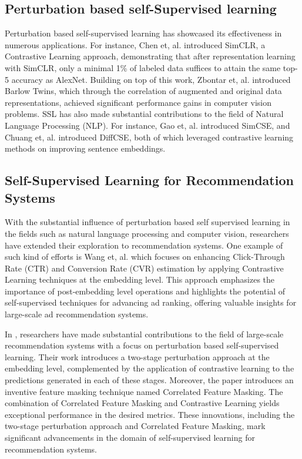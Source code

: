 \subsection{Perturbation based self-Supervised learning} Perturbation based self-supervised learning has showcased its effectiveness in numerous applications.
For instance, Chen et, al. \cite{chen2020simple} introduced SimCLR, a Contrastive Learning approach, demonstrating that after representation learning with SimCLR, only a minimal 1\% of labeled data suffices to attain the same top-5 accuracy as AlexNet. Building on top of this work, Zbontar et, al. \cite{zbontar2021barlow} introduced Barlow Twins, which through the correlation of augmented and original data representations, achieved significant performance gains in computer vision problems. SSL has also made substantial contributions to the field of Natural Language Processing (NLP).  For instance, Gao et, al. \cite{gao2021simcse} introduced SimCSE, and Chuang et, al. \cite{chuang2022diffcse} introduced DiffCSE, both of which leveraged contrastive learning methods on improving sentence embeddings.


\subsection{Self-Supervised Learning for Recommendation Systems} With the substantial influence of perturbation based self supervised learning in the fields such as natural language processing and computer vision, researchers have extended their exploration to recommendation systems. One example of such kind of efforts is Wang et, al. \cite{contrastive_for_ctr} which focuses on enhancing Click-Through Rate (CTR) and Conversion Rate (CVR) estimation by applying Contrastive Learning techniques at the embedding level. This approach emphasizes the importance of post-embedding level operations and highlights the potential of self-supervised techniques for advancing ad ranking, offering valuable insights for large-scale ad recommendation systems.

In \cite{augmentation2}, researchers have made substantial contributions to the field of large-scale recommendation systems with a focus on perturbation based self-supervised learning. Their work introduces a two-stage perturbation approach at the embedding level, complemented by the application of contrastive learning to the predictions generated in each of these stages. Moreover, the paper introduces an inventive feature masking technique named Correlated Feature Masking. The combination of Correlated Feature Masking and Contrastive Learning yields exceptional performance in the desired metrics. These innovations, including the two-stage perturbation approach and Correlated Feature Masking, mark significant advancements in the domain of self-supervised learning for recommendation systems.

